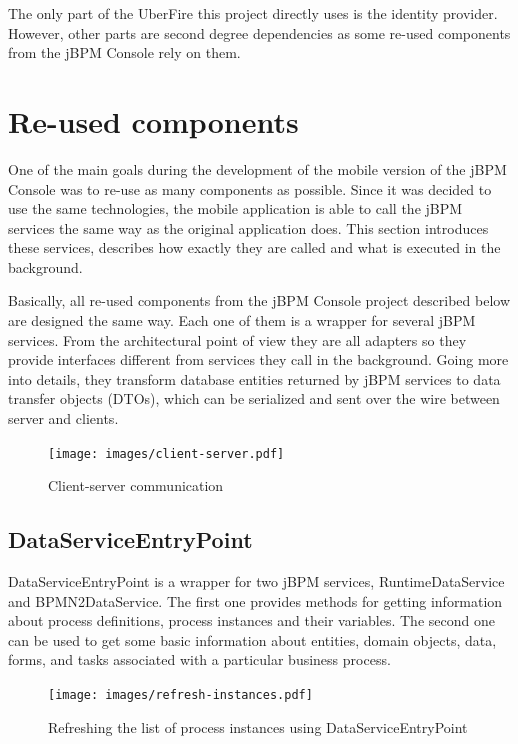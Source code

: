 \documentclass[12pt,oneside,final]{fithesis2}
\begin{document}
The only part of the UberFire this project directly uses is the identity provider.
However, other parts are second degree dependencies as some re-used components from the jBPM Console rely on them.

\section{Re-used components}
One of the main goals during the development of the mobile version of the jBPM Console was to re-use as many components as possible.
Since it was decided to use the same technologies, the mobile application is able to call the jBPM services the same way as the original application does.
This section introduces these services, describes how exactly they are called and what is executed in the background.

Basically, all re-used components from the jBPM Console project described below are designed the same way.
Each one of them is a wrapper for several jBPM services.
From the architectural point of view they are all adapters so they provide interfaces different from services they call in the background.
Going more into details, they transform database entities returned by jBPM services to data transfer objects (DTOs), which can be serialized and sent over the wire between server and clients.

\begin{figure}[ht!]
\centering
\texttt{[image: images/client-server.pdf]}
\caption{Client-server communication}
\label{fig:client-server}
\end{figure}

\label{sec:reused-components}
\subsection{DataServiceEntryPoint}

DataServiceEntryPoint is a wrapper for two jBPM services, RuntimeDataService and BPMN2DataService.
The first one provides methods for getting information about process definitions, process instances and their variables.
The second one can be used to get some basic information about entities, domain objects, data, forms, and tasks associated with a particular business process.

\begin{figure}[ht!]
\centering
\texttt{[image: images/refresh-instances.pdf]}
\caption{Refreshing the list of process instances using DataServiceEntryPoint}
\label{fig:refresh-instances}
\end{figure}
\end{document}
